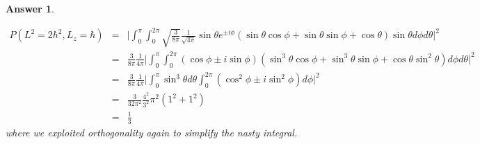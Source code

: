 \documentclass[a4paper]{article}
\newtheorem{ans}{Answer}[subsection]
\theoremstyle{new}
\begin{document}
\begin{ans}
\begin{enumerate}[label=(\roman*)]
\begin{eqnarray}
P(L^2=2\hbar^2,L_z=\hbar)&=&
\bigg|\int_0^\pi\int_0^{2\pi}\sqrt{\frac{3}{8\pi}}\frac{1}{\sqrt{4\pi}}\sin\theta e^{\pm i\phi}(\sin\theta\cos\phi+\sin\theta\sin\phi+\cos\theta)\sin\theta d\phi d\theta\bigg|^2\nonumber\\&=&\frac{3}{8\pi}\frac{1}{4\pi}\bigg|\int_0^\pi\int_0^{2\pi}(\cos\phi\pm i\sin\phi)(\sin^3\theta\cos\phi+\sin^3\theta\sin\phi+\cos\theta\sin^2\theta)d\phi d\theta\bigg|^2\nonumber\\&=&\frac{3}{8\pi}\frac{1}{4\pi}\bigg|\int_0^\pi\sin^3\theta d\theta\int_0^{2\pi}(\cos^2\phi\pm i\sin^2\phi)d\phi\bigg|^2\nonumber\\&=&\frac{3}{32\pi^2}\frac{4^2}{3^2}\pi^2(1^2+1^2)\nonumber\\&=&\frac{1}{3}\nonumber
\end{eqnarray}
where we exploited orthogonality again to simplify the nasty integral.
\end{enumerate}
\end{ans}
\newpage
\end{document}

